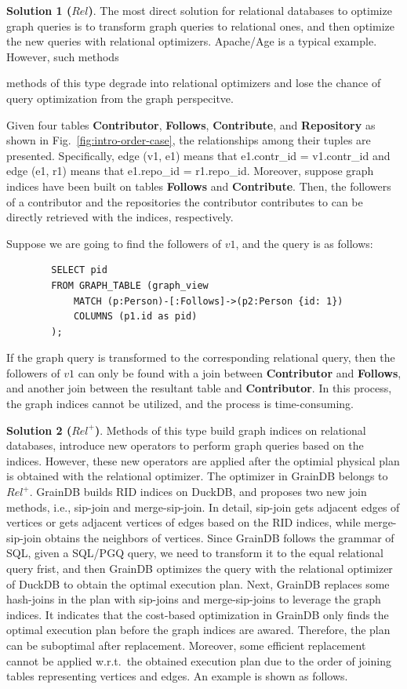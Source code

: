 \textbf{Solution 1 ($Rel$)}. 
The most direct solution for relational databases to optimize graph queries is to transform graph queries to relational ones, and then optimize the new queries with relational optimizers.
Apache/Age is a typical example.
However, such methods 

methods of this type degrade into relational optimizers and lose the chance of query optimization from the graph perspecitve.

\begin{example}
    Given four tables \textbf{Contributor}, \textbf{Follows}, \textbf{Contribute}, and \textbf{Repository} as shown in Fig.~\ref{fig:intro-order-case}, the relationships among their tuples are presented.
    Specifically, edge (v1, e1) means that e1.contr\_id = v1.contr\_id and edge (e1, r1) means that e1.repo\_id = r1.repo\_id.
    Moreover, suppose graph indices have been built on tables \textbf{Follows} and \textbf{Contribute}.
    Then, the followers of a contributor and the repositories the contributor contributes to can be directly retrieved with the indices, respectively.

    Suppose we are going to find the followers of $v1$, and the query is as follows:
    \begin{lstlisting}
        SELECT pid
        FROM GRAPH_TABLE (graph_view
            MATCH (p:Person)-[:Follows]->(p2:Person {id: 1})
            COLUMNS (p1.id as pid)
        );
    \end{lstlisting}
    If the graph query is transformed to the corresponding relational query, then the followers of $v1$ can only be found with a join between \textbf{Contributor} and \textbf{Follows}, and another join between the resultant table and \textbf{Contributor}.
    In this process, the graph indices cannot be utilized, and the process is time-consuming.
\end{example}


\textbf{Solution 2 ($Rel^+$)}.
Methods of this type build graph indices on relational databases, introduce new operators to perform graph queries based on the indices.
However, these new operators are applied after the optimial physical plan is obtained with the relational optimizer.
The optimizer in GrainDB belongs to $Rel^+$.
GrainDB builds RID indices on DuckDB, and proposes two new join methods, i.e., sip-join and merge-sip-join.
In detail, sip-join gets adjacent edges of vertices or gets adjacent vertices of edges based on the RID indices, while merge-sip-join obtains the neighbors of vertices.
Since GrainDB follows the grammar of SQL, given a SQL/PGQ query, we need to transform it to the equal relational query frist, and then GrainDB optimizes the query with the relational optimizer of DuckDB to obtain the optimal execution plan.
Next, GrainDB replaces some hash-joins in the plan with sip-joins and merge-sip-joins to leverage the graph indices.
It indicates that the cost-based optimization in GrainDB only finds the optimal execution plan before the graph indices are awared.
Therefore, the plan can be suboptimal after replacement.
Moreover, some efficient replacement cannot be applied w.r.t.~the obtained execution plan due to the order of joining tables representing vertices and edges.
An example is shown as follows.

